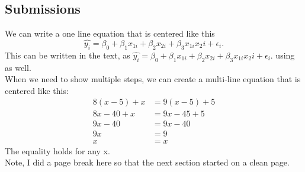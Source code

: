 \documentclass{article}\usepackage[]{graphicx}\usepackage[]{xcolor}
\begin{document}
\begin{multicols}{2}
\subsection{Submissions}
We can write a one line equation that is centered like this 
\[\widehat{y_i} = \beta_0 + \beta_1 x_{1i} + \beta_2 x_{2i} + \beta_3 x_{1i} {x_2i} + \epsilon_i.\]
This can be written in the text, as $\widehat{y_i} = \beta_0 + \beta_1 x_{1i} + \beta_2 x_{2i} + \beta_3 x_{1i} {x_2i} + \epsilon_i.$ using as well.\\
\indent When we need to show multiple steps, we can create a multi-line equation that is centered like this:
\begin{align*}
8(x-5)+x&=9(x-5)+5\\
8x-40+x&=9x-45+5\tag{Distributing}\\
9x-40&=9x-40\tag{Combining like terms}\\
9x&=9\tag{Adding 40 to both sides}\\
x&=x\tag{Dividing both sides by 9}
\end{align*}
The equality holds for any x.\\
\indent Note, I did a page break here so that the next section started on a clean page.
\newpage


\end{multicols}
\end{document}
